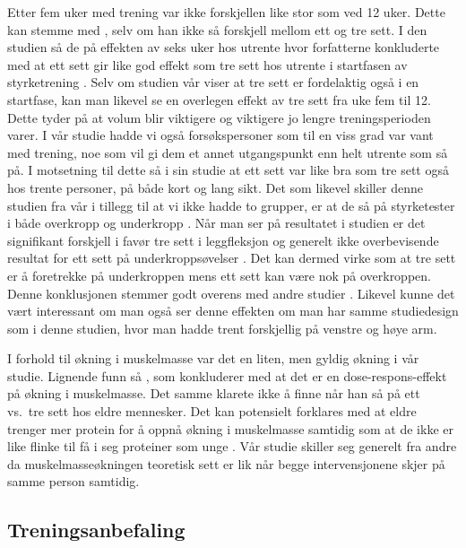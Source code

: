 \documentclass[
]{book}
\begin{document}
Etter fem uker med trening var ikke forskjellen like stor som ved 12 uker. Dette kan stemme med \citet{radaelli2014}, selv om han ikke så forskjell mellom ett og tre sett. I den studien så de på effekten av seks uker hos utrente hvor forfatterne konkluderte med at ett sett gir like god effekt som tre sett hos utrente i startfasen av styrketrening \citep{radaelli2014}. Selv om studien vår viser at tre sett er fordelaktig også i en startfase, kan man likevel se en overlegen effekt av tre sett fra uke fem til 12. Dette tyder på at volum blir viktigere og viktigere jo lengre treningsperioden varer. I vår studie hadde vi også forsøkspersoner som til en viss grad var vant med trening, noe som vil gi dem et annet utgangspunkt enn helt utrente som \citet{radaelli2014} så på. I motsetning til dette så \citet{hass2000} i sin studie at ett sett var like bra som tre sett også hos trente personer, på både kort og lang sikt. Det som likevel skiller denne studien fra vår i tillegg til at vi ikke hadde to grupper, er at de så på styrketester i både overkropp og underkropp \citep{hass2000}. Når man ser på resultatet i studien er det signifikant forskjell i favør tre sett i leggfleksjon og generelt ikke overbevisende resultat for ett sett på underkroppsøvelser \citep{hass2000}. Det kan dermed virke som at tre sett er å foretrekke på underkroppen mens ett sett kan være nok på overkroppen. Denne konklusjonen stemmer godt overens med andre studier \citep{rønnestad2007, paulsen2003}. Likevel kunne det vært interessant om man også ser denne effekten om man har samme studiedesign som i denne studien, hvor man hadde trent forskjellig på venstre og høye arm.

I forhold til økning i muskelmasse var det en liten, men gyldig økning i vår studie. Lignende funn så \citet{schoenfeld2019}, som konkluderer med at det er en dose-respons-effekt på økning i muskelmasse. Det samme klarete ikke \citet{galvão2005} å finne når han så på ett vs.~tre sett hos eldre mennesker. Det kan potensielt forklares med at eldre trenger mer protein for å oppnå økning i muskelmasse samtidig som at de ikke er like flinke til få i seg proteiner som unge \citep{kraemer1999, moore2015}. Vår studie skiller seg generelt fra andre da muskelmasseøkningen teoretisk sett er lik når begge intervensjonene skjer på samme person samtidig.

\hypertarget{treningsanbefaling}{%
\subsection{Treningsanbefaling}\label{treningsanbefaling}}
\end{document}
